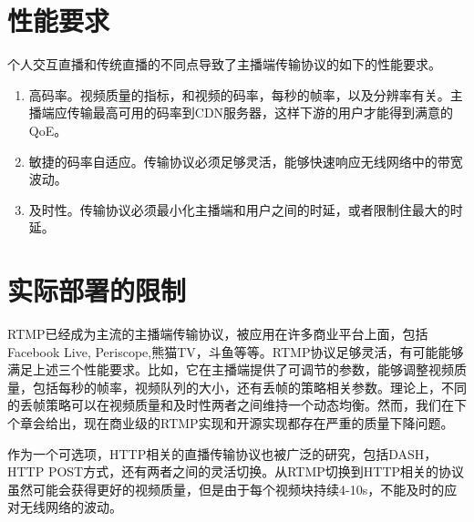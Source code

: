 \section{性能要求}
个人交互直播和传统直播的不同点导致了主播端传输协议的如下的性能要求。
\begin{enumerate}
  \item 高码率。视频质量的指标，和视频的码率，每秒的帧率，以及分辨率有关。主播端应传输最高可用的码率到CDN服务器，这样下游的用户才能得到满意的QoE。
  \item 敏捷的码率自适应。传输协议必须足够灵活，能够快速响应无线网络中的带宽波动。
  \item 及时性。传输协议必须最小化主播端和用户之间的时延，或者限制住最大的时延。
\end{enumerate}

\section{实际部署的限制}
RTMP已经成为主流的主播端传输协议，被应用在许多商业平台上面，包括Facebook Live, Periscope,熊猫TV，斗鱼等等。RTMP协议足够灵活，有可能能够满足上述三个性能要求。比如，它在主播端提供了可调节的参数，能够调整视频质量，包括每秒的帧率，视频队列的大小，还有丢帧的策略相关参数。理论上，不同的丢帧策略可以在视频质量和及时性两者之间维持一个动态均衡。然而，我们在下个章会给出，现在商业级的RTMP实现和开源实现都存在严重的质量下降问题。

作为一个可选项，HTTP相关的直播传输协议也被广泛的研究，包括DASH，HTTP POST方式，还有两者之间的灵活切换。从RTMP切换到HTTP相关的协议虽然可能会获得更好的视频质量，但是由于每个视频块持续4-10s，不能及时的应对无线网络的波动。